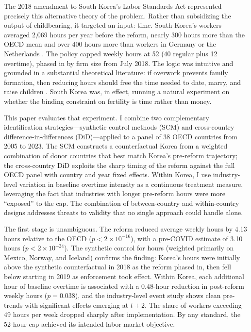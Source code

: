 \documentclass[12pt]{article}
\begin{document}
The 2018 amendment to South Korea's Labor Standards Act represented precisely this alternative theory of the problem. Rather than subsidizing the output of childbearing, it targeted an input: time. South Korea's workers averaged 2,069 hours per year before the reform, nearly 300 hours more than the OECD mean and over 400 hours more than workers in Germany or the Netherlands \citep{oecd2023hours}. The policy capped weekly hours at 52 (40 regular plus 12 overtime), phased in by firm size from July 2018. The logic was intuitive and grounded in a substantial theoretical literature: if overwork prevents family formation, then reducing hours should free the time needed to date, marry, and raise children \citep{ahn2002new, mcdonald2000gender}. South Korea was, in effect, running a natural experiment on whether the binding constraint on fertility is time rather than money.

This paper evaluates that experiment. I combine two complementary identification strategies---synthetic control methods (SCM) and cross-country difference-in-differences (DiD)---applied to a panel of 38 OECD countries from 2005 to 2023. The SCM constructs a counterfactual Korea from a weighted combination of donor countries that best match Korea's pre-reform trajectory; the cross-country DiD exploits the sharp timing of the reform against the full OECD panel with country and year fixed effects. Within Korea, I use industry-level variation in baseline overtime intensity as a continuous treatment measure, leveraging the fact that industries with longer pre-reform hours were more ``exposed'' to the cap. The combination of between-country and within-country designs addresses threats to validity that no single approach could handle alone.

The first stage is unambiguous. The reform reduced average weekly hours by 4.13 hours relative to the OECD ($p < 2 \times 10^{-16}$), with a pre-COVID estimate of 3.10 hours ($p < 2 \times 10^{-24}$). The synthetic control for hours (weighted primarily on Mexico, Norway, and Iceland) confirms the finding: Korea's hours were initially above the synthetic counterfactual in 2018 as the reform phased in, then fell below starting in 2019 as enforcement took effect. Within Korea, each additional hour of baseline overtime is associated with a 0.48-hour reduction in post-reform weekly hours ($p = 0.038$), and the industry-level event study shows clean pre-trends with significant effects emerging at $t+2$. The share of workers exceeding 49 hours per week dropped sharply after implementation. By any standard, the 52-hour cap achieved its intended labor market objective.
\end{document}
